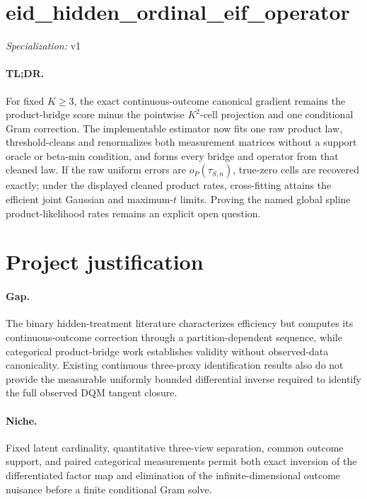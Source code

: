 \documentclass{article}
\begin{document}
\sloppy

\section*{eid\_\allowbreak{}hidden\_\allowbreak{}ordinal\_\allowbreak{}eif\_\allowbreak{}operator}

\noindent\textit{Specialization:} v1\par

\paragraph{TL;DR.} For fixed \(K\geq3\), the exact continuous-outcome canonical gradient remains the product-bridge score minus the pointwise \(K^2\)-cell projection and one conditional Gram correction.  The implementable estimator now fits one raw product law, threshold-cleans and renormalizes both measurement matrices without a support oracle or beta-min condition, and forms every bridge and operator from that cleaned law.  If the raw uniform errors are \(o_P(\tau_{S,n})\), true-zero cells are recovered exactly; under the displayed cleaned product rates, cross-fitting attains the efficient joint Gaussian and maximum-\(t\) limits.  Proving the named global spline product-likelihood rates remains an explicit open question.

\section{Project justification}

\paragraph{Gap.} The binary hidden-treatment literature characterizes efficiency but computes its continuous-outcome correction through a partition-dependent sequence, while categorical product-bridge work establishes validity without observed-data canonicality. Existing continuous three-proxy identification results also do not provide the measurable uniformly bounded differential inverse required to identify the full observed DQM tangent closure.

\paragraph{Niche.} Fixed latent cardinality, quantitative three-view separation, common outcome support, and paired categorical measurements permit both exact inversion of the differentiated factor map and elimination of the infinite-dimensional outcome nuisance before a finite conditional Gram solve.
\end{document}
